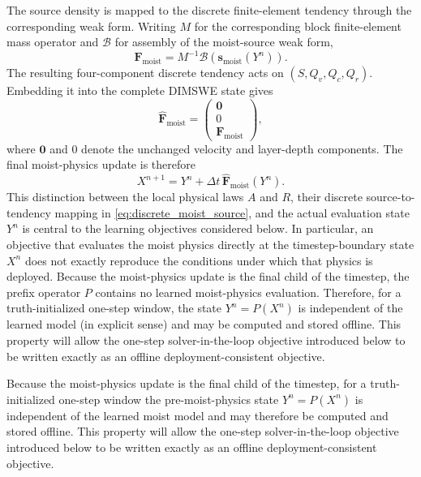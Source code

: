 \documentclass[12pt]{article}
\begin{document}
The source density is mapped to the discrete finite-element tendency through the corresponding weak form. Writing $M$ for the corresponding block finite-element mass operator and $\mathcal{B}$ for assembly of the moist-source weak form,
\begin{equation}
	\mathbf{F}_{\mathrm{moist}}
	=
	M^{-1}
	\mathcal{B}\!\left(
	\mathbf{s}_{\mathrm{moist}}(Y^n)
	\right).
	\label{eq:discrete_moist_source}
\end{equation}
The resulting four-component discrete tendency acts on $(S,Q_v,Q_c,Q_r)$. Embedding it into the complete DIMSWE state gives
\begin{equation}
	\widehat{\mathbf{F}}_{\mathrm{moist}}
	=
	\begin{pmatrix}
		\mathbf{0}\\
		0\\
		\mathbf{F}_{\mathrm{moist}}
	\end{pmatrix},
	\label{eq:full_moist_tendency}
\end{equation}
where $\mathbf{0}$ and $0$ denote the unchanged velocity and layer-depth components.
The final moist-physics update is therefore
\begin{equation}
	X^{n+1}
	=
	Y^n+\Delta t\,
	\widehat{\mathbf{F}}_{\mathrm{moist}}(Y^n).
	\label{eq:moist_euler_update}
\end{equation}
This distinction between the local physical laws $A$ and $R$, their discrete source-to-tendency mapping in \eqref{eq:discrete_moist_source}, and the actual evaluation state $Y^n$ is central to the learning objectives considered below. In particular, an objective that evaluates the moist physics directly at the timestep-boundary state $X^n$ does not exactly reproduce the conditions under which that physics is deployed. Because the moist-physics update is the final child of the timestep, the
prefix operator $P$ contains no learned moist-physics evaluation. Therefore, for a truth-initialized one-step window, the state $Y^n=P(X^n)$ is independent of the learned model (in explicit sense) and may be computed and stored offline. This property will allow the one-step solver-in-the-loop objective introduced below to be written exactly as an offline deployment-consistent objective.


Because the moist-physics update is the final child of the timestep, for a truth-initialized one-step window the pre-moist-physics state $Y^n=P(X^n)$ is independent of the learned moist model and may therefore be computed and stored offline. This property will allow the one-step solver-in-the-loop objective introduced below to be written exactly as an offline deployment-consistent objective.
\end{document}
